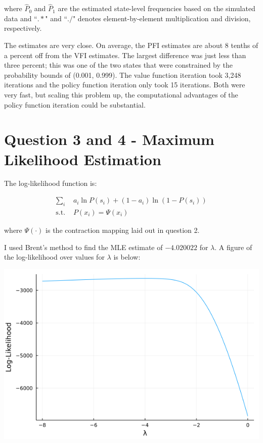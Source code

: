 \documentclass{article}
\begin{document}
where $\hat{P}_0$ and $\hat{P}_1$ are the estimated state-level frequencies based on the simulated data and ``$.*$" and ``$./$" denotes element-by-element multiplication and division, respectively.

\bigskip

The estimates are very close.  On average, the PFI estimates are about 8 tenths of a percent off from the VFI estimates. The largest difference was just less than three percent; this was one of the two states that were constrained by the probability bounds of (0.001, 0.999). The value function iteration took 3,248 iterations and the policy function iteration only took 15 iterations.  Both were very fast, but scaling this problem up, the computational advantages of the policy function iteration could be substantial.

\pagebreak


\pagebreak

\section*{Question 3 and 4 - Maximum Likelihood Estimation}

The log-likelihood function is:

\begin{align*}
\sum_i & a_i \ln P(s_i) + (1-a_i) \ln (1 - P(s_i)) \\
\text{s.t. } & P(x_i) = \Psi(x_i)
\end{align*}

where $\Psi(\cdot)$ is the contraction mapping laid out in question 2.

\bigskip

I used Brent's method to find the MLE estimate of $-4.020022$ for $\lambda$.  A figure of the log-likelihood over values for $\lambda$ is below:

\includegraphics[scale=.75]{question_4.png}
\end{document}

